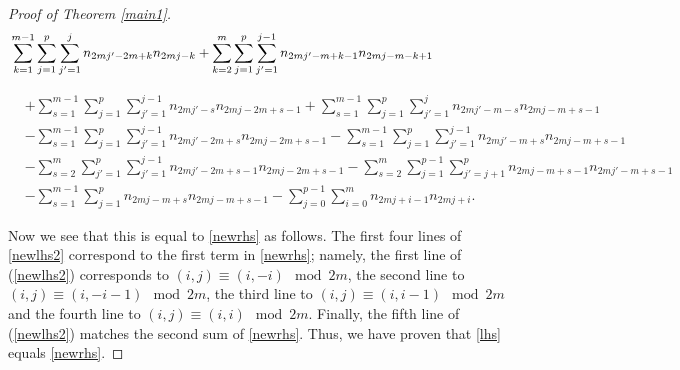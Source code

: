 \documentclass[11pt,reqno]{amsart}
\theoremstyle{definition}
\numberwithin{equation}{section}
\begin{document}
\begin{proof}[Proof of Theorem \ref{main1}]
\begin{equation*} 
\begin{aligned}
& \sum_{k=1}^{m-1} \sum_{j=1}^{p} \sum_{j'=1}^{j} n_{2mj'-2m+k} n_{2mj-k} + \sum_{k=2}^{m} \sum_{j=1}^{p} \sum_{j'=1}^{j-1} n_{2mj'-m+k-1} n_{2mj-m-k+1} \hphantom{xxxxxxxxxx} \\
\end{aligned}
\end{equation*}

\begin{equation} \label{newlhs2}
\begin{aligned}
& + \sum_{s=1}^{m-1} \sum_{j=1}^{p} \sum_{j'=1}^{j-1} n_{2mj'-s} n_{2mj-2m + s-1} + \sum_{s=1}^{m-1} \sum_{j=1}^{p} \sum_{j'=1}^{j} n_{2mj'-m-s} n_{2mj-m + s-1} \\
& - \sum_{s=1}^{m-1} \sum_{j=1}^{p} \sum_{j'=1}^{j-1} n_{2mj'-2m+s} n_{2mj-2m + s-1} - \sum_{s=1}^{m-1} \sum_{j=1}^{p} \sum_{j'=1}^{j-1} n_{2mj'-m+s} n_{2mj-m+s-1} \\
& - \sum_{s=2}^{m} \sum_{j'=1}^{p} \sum_{j'=1}^{j-1} n_{2mj'-2m + s-1} n_{2mj-2m+s-1} - \sum_{s=2}^{m} \sum_{j=1}^{p-1} \sum_{j'=j+1}^{p} n_{2mj-m+s-1} n_{2mj'-m+s-1} \\
& - \sum_{s=1}^{m-1} \sum_{j=1}^{p} n_{2mj-m+s} n_{2mj-m+s-1} - \sum_{j=0}^{p-1} \sum_{i=0}^{m} n_{2mj+i-1} n_{2mj+i}.
\end{aligned}
\end{equation}

\noindent Now we see that this is equal to \eqref{newrhs} as follows.   The first four lines of \eqref{newlhs2} correspond to the first term in \eqref{newrhs}; namely, the first line of (\ref{newlhs2}) corresponds to $(i,j) \equiv (i,-i) \mod{2m}$, the second line to $(i,j) \equiv (i, -i-1) \mod{2m}$, the third line to $(i,j) \equiv (i,i-1) \mod{2m}$ and the fourth line to $(i,j) \equiv (i,i) \mod{2m}$. Finally, the fifth line of (\ref{newlhs2}) matches the second sum of \eqref{newrhs}. Thus, we have proven that \eqref{lhs} equals \eqref{newrhs}.

\end{proof}
\end{document}
